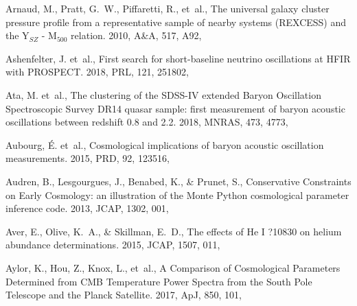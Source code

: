 \documentclass[longauth,traditabstract]{aa}
\def\aap{{A\&A}}
\def\apj{{ApJ}}
\def\mnras{{MNRAS}}
\def\prd{{PRD}}
\def\prl{{PRL}}
\def\jcap{{JCAP}}
\begin{document}
\begin{thebibliography}{379}
{Arnaud}, M., {Pratt}, G.~W., {Piffaretti}, R., {et~al.}, {The universal galaxy
  cluster pressure profile from a representative sample of nearby systems
  (REXCESS) and the Y$_{SZ}$ - M$_{500}$ relation}. 2010, \aap, 517, A92,

Ashenfelter, J. {et~al.}, {First search for short-baseline neutrino
  oscillations at HFIR with PROSPECT}. 2018, \prl, 121, 251802,

Ata, M. {et~al.}, {The clustering of the SDSS-IV extended Baryon Oscillation
  Spectroscopic Survey DR14 quasar sample: first measurement of baryon acoustic
  oscillations between redshift 0.8 and 2.2}. 2018, \mnras, 473, 4773,

Aubourg, {\'E}. {et~al.}, {Cosmological implications of baryon acoustic
  oscillation measurements}. 2015, \prd, 92, 123516, 

Audren, B., Lesgourgues, J., Benabed, K., \& Prunet, S., {Conservative
  Constraints on Early Cosmology: an illustration of the Monte Python
  cosmological parameter inference code}. 2013, JCAP, 1302, 001,

Aver, E., Olive, K.~A., \& Skillman, E.~D., {The effects of He I ?10830 on
  helium abundance determinations}. 2015, \jcap, 1507, 011, 

{Aylor}, K., {Hou}, Z., {Knox}, L., {et~al.}, {A Comparison of Cosmological
  Parameters Determined from CMB Temperature Power Spectra from the South Pole
  Telescope and the Planck Satellite}. 2017, \apj, 850, 101,


\end{thebibliography}
\end{document}
